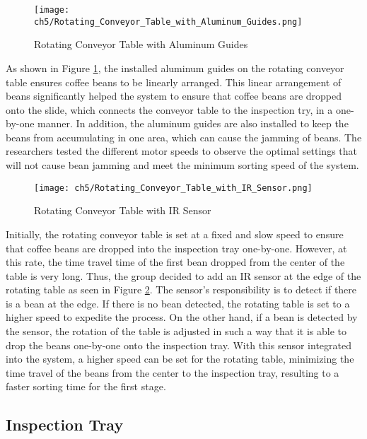 \begin{figure}[H]
    \centering
    \texttt{[image: ch5/Rotating\_Conveyor\_Table\_with\_Aluminum\_Guides.png]}
    \caption{Rotating Conveyor Table with Aluminum Guides}
    \label{fig:rotating_conveyor_aluminum}
\end{figure}
As shown in Figure \ref{fig:rotating_conveyor_aluminum}, the installed aluminum guides on the rotating conveyor table ensures coffee beans to be linearly arranged. This linear arrangement of beans significantly helped the system to ensure that coffee beans are dropped onto the slide, which connects the conveyor table to the inspection try, in a one-by-one manner. In addition, the aluminum guides are also installed to keep the beans from accumulating in one area, which can cause the jamming of beans. The researchers tested the different motor speeds to observe the optimal settings that will not cause bean jamming and meet the minimum sorting speed of the system.


\begin{figure}[H]
    \centering
    \texttt{[image: ch5/Rotating\_Conveyor\_Table\_with\_IR\_Sensor.png]}
    \caption{Rotating Conveyor Table with IR Sensor}
    \label{fig:rotating_conveyor_sensor}
\end{figure}
Initially, the rotating conveyor table is set at a fixed and slow speed to ensure that coffee beans are dropped into the inspection tray one-by-one. However, at this rate, the time travel time of the first bean dropped from the center of the table is very long. Thus, the group decided to add an IR sensor at the edge of the rotating table as seen in Figure \ref{fig:rotating_conveyor_sensor}. The sensor’s responsibility is to detect if there is a bean at the edge. If there is no bean detected, the rotating table is set to a higher speed to expedite the process. On the other hand, if a bean is detected by the sensor, the rotation of the table is adjusted in such a way that it is able to drop the beans one-by-one onto the inspection tray. With this sensor integrated into the system, a higher speed can be set for the rotating table, minimizing the time travel of the beans from the center to the inspection tray, resulting to a faster sorting time for the first stage. 

\subsection{Inspection Tray}


